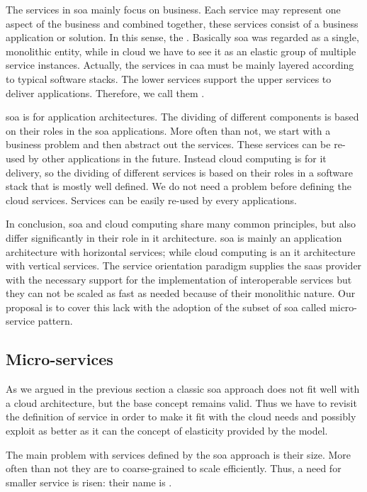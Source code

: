 The services in \ac{soa} mainly focus on business. Each service may represent one aspect of the business and
combined together, these services consist of a business application or solution. In this sense, the
. Basically \ac{soa} was regarded as a single, monolithic entity,
while in cloud we have to see it as an elastic group of  multiple service instances. Actually, the services
in \ac{caa} must be mainly layered according to typical software stacks. The lower services support the upper
services to deliver applications. Therefore, we call them .

\ac{soa} is for application architectures. The dividing of different components is based on their roles in
the \ac{soa} applications. More often than not, we start with a business problem and then abstract out the
services. These services can be re-used by other applications in the future. Instead cloud computing is for
\acs{it} delivery, so the dividing of different services is based on their roles in a software stack that is
mostly well defined. We do not need a problem before defining the cloud services. Services can be easily
re-used by every applications.

In conclusion, \ac{soa} and cloud computing share many common principles, but also differ significantly
in their role in \acs{it} architecture. \ac{soa} is mainly an application architecture with horizontal
services; while cloud computing is an \acs{it} architecture with vertical services. The service orientation
paradigm supplies the \ac{saas} provider with the necessary support for the implementation of interoperable 
services but they can not be scaled as fast as needed because of their monolithic nature. Our proposal is
to cover this lack with the adoption of the subset of \ac{soa} called micro-service pattern.

\subsection{Micro-services}
\label{sec:architecture-soaRevisitation-microService}
As we argued in the previous section a classic \ac{soa} approach does not fit well with a cloud
architecture, but the base concept remains valid. Thus we have to revisit the definition of
service in order to make it fit with the cloud needs and possibly exploit as better as it can the
concept of elasticity provided by the model.

The main problem with services defined by the \ac{soa} approach is their size. More often than not
they are to coarse-grained to scale efficiently. Thus, a need for smaller service is risen: their
name is .

